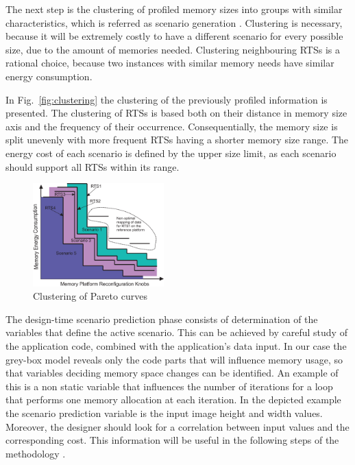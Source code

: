 \documentclass[a4paper,conference]{IEEEtran}
\begin{document}
The next step is the clustering of profiled memory sizes into groups with similar characteristics, which is referred as scenario generation \cite{Fil12}. Clustering is necessary, because it will be extremely costly to have a different scenario for every possible size, due to the amount of memories needed. Clustering neighbouring RTSs is a rational choice, because two instances with similar memory needs have similar energy consumption. 

In Fig.~\ref{fig:clustering} the clustering of the previously profiled information is presented. The clustering of RTSs is based both on their distance in memory size axis and the frequency of their occurrence. Consequentially, the memory size is split unevenly with more frequent RTSs having a shorter memory size range. The energy cost of each scenario is defined by the upper size limit, as each scenario should support all RTSs within its range.

\begin{figure}[!t]
\centering
\includegraphics[width=0.45\textwidth]{Images/2DClustering.eps}
\caption{Clustering of Pareto curves}
\label{fig:pareto}
\end{figure}

The design-time scenario prediction phase consists of determination of the variables that define the active scenario. This can be achieved by careful study of the application code, combined with the application's data input. In our case the grey-box model reveals only the code parts that will influence memory usage, so that variables deciding memory space changes can be identified. An example of this is a non static variable that influences the number of iterations for a loop that performs one memory allocation at each iteration. In the depicted example the scenario prediction variable is the input image height and width values. Moreover, the designer should look for a correlation between input values and the corresponding cost. This information will be useful in the following steps of the methodology \cite{tcm}.
\end{document}
